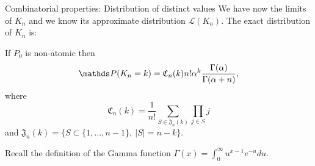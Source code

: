 \begin{frame}[allowframebreaks]{Combinatorial properties: Distribution of distinct values}
	We have now the limits of $K_n$ and we know its approximate distribution $\mathcal{L}(K_n)$. The \alert{exact distribution of $K_n$} is:
\begin{proposition}[Distribution of $K_n$]
If $P_0$ is non-atomic then 
\begin{equation}\label{distr_of_Kn}
    \P(K_n=k) = \mathfrak{C}_n(k) n!\PrecisonParam ^k \frac{\Gamma(\PrecisonParam)}{\Gamma(\PrecisonParam+n)},
\end{equation}
where 
\begin{equation}\label{mathfrakC_def}
\mathfrak{C}_n(k)=\frac{1}{n!}\sum_{S\in\mathfrak{J}_n(k)} \prod_{j\in S}j    
\end{equation}
and $\mathfrak{J}_n(k)=\{ S\subset \{ 1,\ldots,n-1\},\ |S|=n-k \}$.
\end{proposition}

 Recall the definition of the \alert{Gamma function} $\Gamma(x)=\int_0^\infty u^{x-1}e^{-u}du$.
 
\framebreak




\end{frame}

